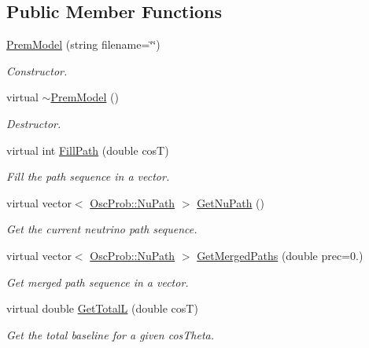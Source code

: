 \subsection*{Public Member Functions}
\begin{DoxyCompactItemize}
\item 
\hyperlink{classOscProb_1_1PremModel_a822616917c4af8c6d3fc8d035b4d7a7d}{Prem\+Model} (string filename=\char`\"{}\char`\"{})
\begin{DoxyCompactList}\small\item\em Constructor. \end{DoxyCompactList}\item 
virtual \hyperlink{classOscProb_1_1PremModel_aac484ca4e607f2b0fc6f599358cb95fb}{$\sim$\+Prem\+Model} ()
\begin{DoxyCompactList}\small\item\em Destructor. \end{DoxyCompactList}\item 
virtual int \hyperlink{classOscProb_1_1PremModel_ac69162cc5e3c8b7c1b8a85571ff2063b}{Fill\+Path} (double cosT)
\begin{DoxyCompactList}\small\item\em Fill the path sequence in a vector. \end{DoxyCompactList}\item 
virtual vector$<$ \hyperlink{structOscProb_1_1NuPath}{Osc\+Prob\+::\+Nu\+Path} $>$ \hyperlink{classOscProb_1_1PremModel_adbe7a5df260cba3923f5cbcb8ab2f03f}{Get\+Nu\+Path} ()
\begin{DoxyCompactList}\small\item\em Get the current neutrino path sequence. \end{DoxyCompactList}\item 
virtual vector$<$ \hyperlink{structOscProb_1_1NuPath}{Osc\+Prob\+::\+Nu\+Path} $>$ \hyperlink{classOscProb_1_1PremModel_a5b6f83f2e9b7087e8faad1f19f00ebd5}{Get\+Merged\+Paths} (double prec=0.)
\begin{DoxyCompactList}\small\item\em Get merged path sequence in a vector. \end{DoxyCompactList}\item 
virtual double \hyperlink{classOscProb_1_1PremModel_ae258b41cca80631e3041f0421b25afeb}{Get\+TotalL} (double cosT)
\begin{DoxyCompactList}\small\item\em Get the total baseline for a given cos\+Theta. \end{DoxyCompactList}\item 

\end{DoxyCompactItemize}
